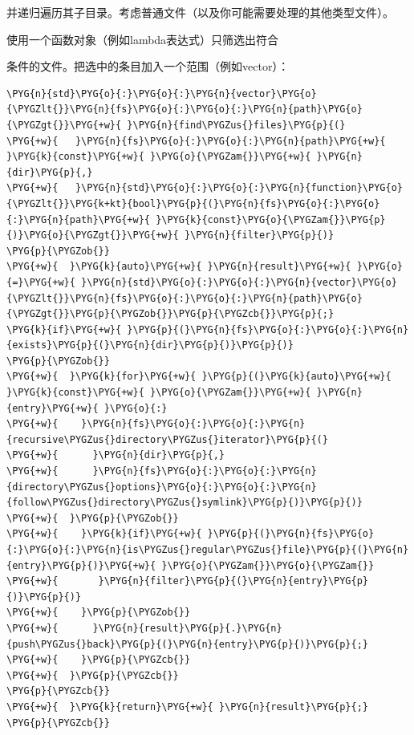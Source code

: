 
并递归遍历其子目录。考虑普通文件（以及你可能需要处理的其他类型文件）。



使用一个函数对象（例如lambda表达式）只筛选出符合



条件的文件。把选中的条目加入一个范围（例如vector）：



\begin{codeblockbg}
\begin{Verbatim}[commandchars=\\\{\},breaklines=true,breakanywhere=true,fontsize=\codefont,xleftmargin=17bp]
\PYG{n}{std}\PYG{o}{:}\PYG{o}{:}\PYG{n}{vector}\PYG{o}{\PYGZlt{}}\PYG{n}{fs}\PYG{o}{:}\PYG{o}{:}\PYG{n}{path}\PYG{o}{\PYGZgt{}}\PYG{+w}{ }\PYG{n}{find\PYGZus{}files}\PYG{p}{(}
\PYG{+w}{   }\PYG{n}{fs}\PYG{o}{:}\PYG{o}{:}\PYG{n}{path}\PYG{+w}{ }\PYG{k}{const}\PYG{+w}{ }\PYG{o}{\PYGZam{}}\PYG{+w}{ }\PYG{n}{dir}\PYG{p}{,}
\PYG{+w}{   }\PYG{n}{std}\PYG{o}{:}\PYG{o}{:}\PYG{n}{function}\PYG{o}{\PYGZlt{}}\PYG{k+kt}{bool}\PYG{p}{(}\PYG{n}{fs}\PYG{o}{:}\PYG{o}{:}\PYG{n}{path}\PYG{+w}{ }\PYG{k}{const}\PYG{o}{\PYGZam{}}\PYG{p}{)}\PYG{o}{\PYGZgt{}}\PYG{+w}{ }\PYG{n}{filter}\PYG{p}{)}
\PYG{p}{\PYGZob{}}
\PYG{+w}{  }\PYG{k}{auto}\PYG{+w}{ }\PYG{n}{result}\PYG{+w}{ }\PYG{o}{=}\PYG{+w}{ }\PYG{n}{std}\PYG{o}{:}\PYG{o}{:}\PYG{n}{vector}\PYG{o}{\PYGZlt{}}\PYG{n}{fs}\PYG{o}{:}\PYG{o}{:}\PYG{n}{path}\PYG{o}{\PYGZgt{}}\PYG{p}{\PYGZob{}}\PYG{p}{\PYGZcb{}}\PYG{p}{;}
\PYG{k}{if}\PYG{+w}{ }\PYG{p}{(}\PYG{n}{fs}\PYG{o}{:}\PYG{o}{:}\PYG{n}{exists}\PYG{p}{(}\PYG{n}{dir}\PYG{p}{)}\PYG{p}{)}
\PYG{p}{\PYGZob{}}
\PYG{+w}{  }\PYG{k}{for}\PYG{+w}{ }\PYG{p}{(}\PYG{k}{auto}\PYG{+w}{ }\PYG{k}{const}\PYG{+w}{ }\PYG{o}{\PYGZam{}}\PYG{+w}{ }\PYG{n}{entry}\PYG{+w}{ }\PYG{o}{:}
\PYG{+w}{    }\PYG{n}{fs}\PYG{o}{:}\PYG{o}{:}\PYG{n}{recursive\PYGZus{}directory\PYGZus{}iterator}\PYG{p}{(}
\PYG{+w}{      }\PYG{n}{dir}\PYG{p}{,}
\PYG{+w}{      }\PYG{n}{fs}\PYG{o}{:}\PYG{o}{:}\PYG{n}{directory\PYGZus{}options}\PYG{o}{:}\PYG{o}{:}\PYG{n}{follow\PYGZus{}directory\PYGZus{}symlink}\PYG{p}{)}\PYG{p}{)}
\PYG{+w}{  }\PYG{p}{\PYGZob{}}
\PYG{+w}{    }\PYG{k}{if}\PYG{+w}{ }\PYG{p}{(}\PYG{n}{fs}\PYG{o}{:}\PYG{o}{:}\PYG{n}{is\PYGZus{}regular\PYGZus{}file}\PYG{p}{(}\PYG{n}{entry}\PYG{p}{)}\PYG{+w}{ }\PYG{o}{\PYGZam{}}\PYG{o}{\PYGZam{}}
\PYG{+w}{       }\PYG{n}{filter}\PYG{p}{(}\PYG{n}{entry}\PYG{p}{)}\PYG{p}{)}
\PYG{+w}{    }\PYG{p}{\PYGZob{}}
\PYG{+w}{      }\PYG{n}{result}\PYG{p}{.}\PYG{n}{push\PYGZus{}back}\PYG{p}{(}\PYG{n}{entry}\PYG{p}{)}\PYG{p}{;}
\PYG{+w}{    }\PYG{p}{\PYGZcb{}}
\PYG{+w}{  }\PYG{p}{\PYGZcb{}}
\PYG{p}{\PYGZcb{}}
\PYG{+w}{  }\PYG{k}{return}\PYG{+w}{ }\PYG{n}{result}\PYG{p}{;}
\PYG{p}{\PYGZcb{}}
\end{Verbatim}
\end{codeblockbg}


